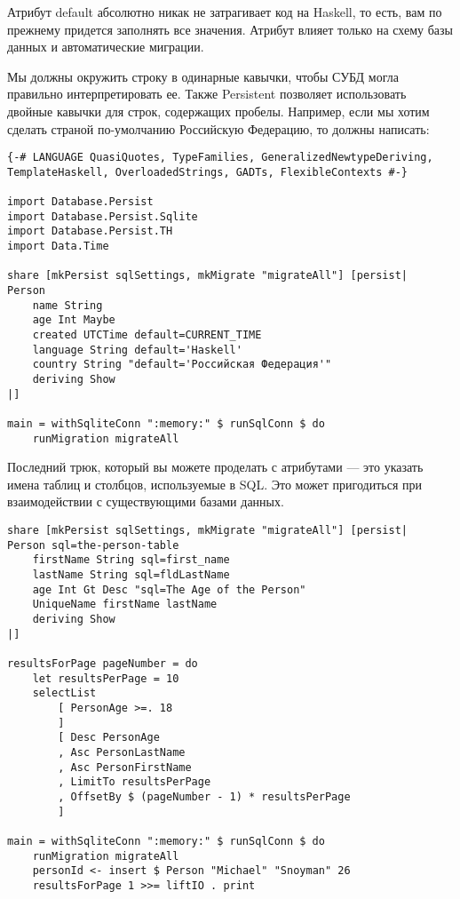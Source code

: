 \begin{remark}
Атрибут default абсолютно никак не затрагивает код на Haskell, то есть, вам по прежнему придется заполнять все значения. Атрибут влияет только на схему базы данных и автоматические миграции.
\end{remark}

Мы должны окружить строку в одинарные кавычки, чтобы СУБД могла правильно интерпретировать ее. Также Persistent позволяет использовать двойные кавычки для строк, содержащих пробелы. Например, если мы хотим сделать страной по-умолчанию Российскую Федерацию, то должны написать:

\begin{lstlisting}
{-# LANGUAGE QuasiQuotes, TypeFamilies, GeneralizedNewtypeDeriving, TemplateHaskell, OverloadedStrings, GADTs, FlexibleContexts #-}

import Database.Persist
import Database.Persist.Sqlite
import Database.Persist.TH
import Data.Time

share [mkPersist sqlSettings, mkMigrate "migrateAll"] [persist|
Person
    name String
    age Int Maybe
    created UTCTime default=CURRENT_TIME
    language String default='Haskell'
    country String "default='Российская Федерация'"
    deriving Show
|]

main = withSqliteConn ":memory:" $ runSqlConn $ do
    runMigration migrateAll
\end{lstlisting}%

Последний трюк, который вы можете проделать с атрибутами --- это указать имена таблиц и столбцов, используемые в SQL. Это может пригодиться при взаимодействии с существующими базами данных.

\begin{lstlisting}
share [mkPersist sqlSettings, mkMigrate "migrateAll"] [persist|
Person sql=the-person-table
    firstName String sql=first_name
    lastName String sql=fldLastName
    age Int Gt Desc "sql=The Age of the Person"
    UniqueName firstName lastName
    deriving Show
|]

resultsForPage pageNumber = do
    let resultsPerPage = 10
    selectList
        [ PersonAge >=. 18
        ]
        [ Desc PersonAge
        , Asc PersonLastName
        , Asc PersonFirstName
        , LimitTo resultsPerPage
        , OffsetBy $ (pageNumber - 1) * resultsPerPage
        ]

main = withSqliteConn ":memory:" $ runSqlConn $ do
    runMigration migrateAll
    personId <- insert $ Person "Michael" "Snoyman" 26
    resultsForPage 1 >>= liftIO . print
\end{lstlisting}%

